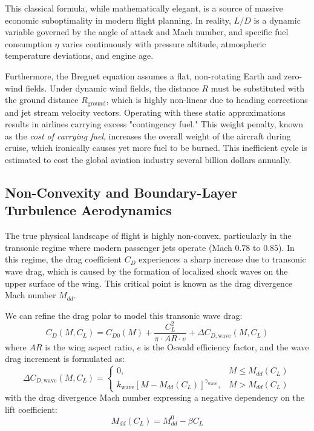 \documentclass[11pt,a4paper]{book}
\begin{document}
This classical formula, while mathematically elegant, is a source of massive economic suboptimality in modern flight planning. In reality, $L/D$ is a dynamic variable governed by the angle of attack and Mach number, and specific fuel consumption $\eta$ varies continuously with pressure altitude, atmospheric temperature deviations, and engine age. 

Furthermore, the Breguet equation assumes a flat, non-rotating Earth and zero-wind fields. Under dynamic wind fields, the distance $R$ must be substituted with the ground distance $R_{\text{ground}}$, which is highly non-linear due to heading corrections and jet stream velocity vectors. Operating with these static approximations results in airlines carrying excess "contingency fuel." This weight penalty, known as the \textit{cost of carrying fuel}, increases the overall weight of the aircraft during cruise, which ironically causes yet more fuel to be burned. This inefficient cycle is estimated to cost the global aviation industry several billion dollars annually.

\subsection{Non-Convexity and Boundary-Layer Turbulence Aerodynamics}

The true physical landscape of flight is highly non-convex, particularly in the transonic regime where modern passenger jets operate (Mach $0.78$ to $0.85$). In this regime, the drag coefficient $C_D$ experiences a sharp increase due to transonic wave drag, which is caused by the formation of localized shock waves on the upper surface of the wing. This critical point is known as the drag divergence Mach number $M_{dd}$.

We can refine the drag polar to model this transonic wave drag:
\begin{equation}
C_D(M, C_L) = C_{D0}(M) + \frac{C_L^2}{\pi \cdot AR \cdot e} + \Delta C_{D,\text{wave}}(M, C_L)
\end{equation}
where $AR$ is the wing aspect ratio, $e$ is the Oswald efficiency factor, and the wave drag increment is formulated as:
\begin{equation}
\Delta C_{D,\text{wave}}(M, C_L) = \begin{cases}
0, & M \leq M_{dd}(C_L) \\
k_{\text{wave}} \left[ M - M_{dd}(C_L) \right]^{\gamma_{\text{wave}}}, & M > M_{dd}(C_L)
\end{cases}
\end{equation}
with the drag divergence Mach number expressing a negative dependency on the lift coefficient:
\begin{equation}
M_{dd}(C_L) = M_{dd}^0 - \beta C_L
\end{equation}
\end{document}
